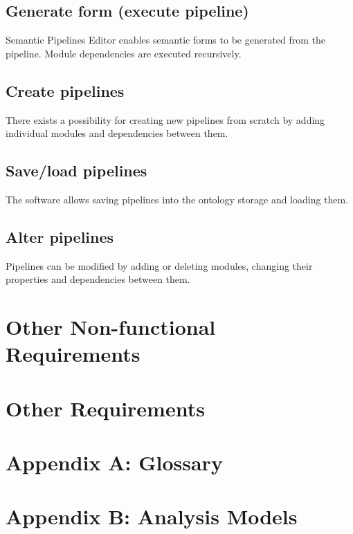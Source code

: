 \documentclass{article}
\begin{document}
\subsection{Generate form (execute pipeline)}
Semantic Pipelines Editor enables semantic forms to be generated from the pipeline. Module dependencies are executed recursively.
\subsection{Create pipelines}
There exists a possibility for creating new pipelines from scratch by adding individual modules and dependencies between them.
\subsection{Save/load pipelines}
The software allows saving pipelines into the ontology storage and loading them.
\subsection{Alter pipelines}
Pipelines can be modified by adding or deleting modules, changing their properties and dependencies between them.
\section{Other Non-functional Requirements}
\section{Other Requirements}
\section*{Appendix A: Glossary}
\section*{Appendix B: Analysis Models}
\end{document}
